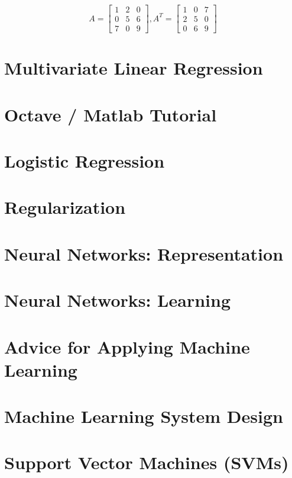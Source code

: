 \documentclass{article}
\begin{document}
        \begin{equation*}
            A =
            \begin{bmatrix}
                1 & 2 & 0 \\
                0 & 5 & 6 \\
                7 & 0 & 9
            \end{bmatrix}
            , A^T =
            \begin{bmatrix}
                1 & 0 & 7 \\
                2 & 5 & 0 \\
                0 & 6 & 9
            \end{bmatrix}
        \end{equation*}



    \pagebreak
    \section{Multivariate Linear Regression}



    \section{Octave / Matlab Tutorial}
    \section{Logistic Regression}
    \section{Regularization}
    \section{Neural Networks: Representation}
    \section{Neural Networks: Learning}
    \section{Advice for Applying Machine Learning}
    \section{Machine Learning System Design}
    \section{Support Vector Machines (SVMs)}
\end{document}
